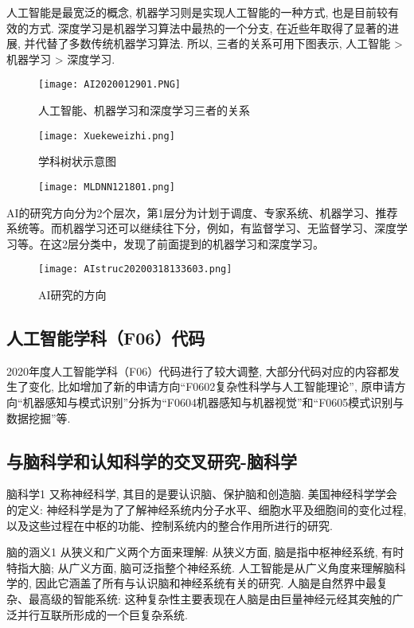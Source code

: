 人工智能是最宽泛的概念, 机器学习则是实现人工智能的一种方式, 也是目前较有效的方式. 深度学习是机器学习算法中最热的一个分支, 在近些年取得了显著的进展, 并代替了多数传统机器学习算法. 所以, 三者的关系可用下图表示, 人工智能 > 机器学习 > 深度学习.
\begin{figure}[htbp]
	\centering
	\texttt{[image: AI2020012901.PNG]}
	\caption{人工智能、机器学习和深度学习三者的关系}
   \label{AI2020012901}
\end{figure}
\begin{figure}[htbp]
	\centering
	\texttt{[image: Xuekeweizhi.png]}
	\caption{学科树状示意图}
   \label{AI:XuekeweizhiFig2}
\end{figure}
\begin{figure}[H]
\centering
\texttt{[image: MLDNN121801.png]}
\label{MLDNN12019121501}
\end{figure}
AI的研究方向分为2个层次，第1层分为计划于调度、专家系统、机器学习、推荐系统等。而机器学习还可以继续往下分，例如，有监督学习、无监督学习、深度学习等。在这2层分类中，发现了前面提到的机器学习和深度学习。
\begin{figure}[H]
\centering
\texttt{[image: AIstruc20200318133603.png]}
\caption{AI研究的方向}
\label{AIstruc20200318133603}
\end{figure}
\subsection{人工智能学科（F06）代码}
2020年度人工智能学科（F06）代码进行了较大调整, 大部分代码对应的内容都发生了变化, 比如增加了新的申请方向“F0602复杂性科学与人工智能理论”,
原申请方向“机器感知与模式识别”分拆为“F0604机器感知与机器视觉”和“F0605模式识别与数据挖掘”等.
\subsection{与脑科学和认知科学的交叉研究-脑科学}
\begin{mydef}{脑科学}{1}
又称神经科学, 其目的是要认识脑、保护脑和创造脑. 美国神经科学学会的定义: 神经科学是为了了解神经系统内分子水平、细胞水平及细胞间的变化过程, 以及这些过程在中枢的功能、控制系统内的整合作用所进行的研究.
\end{mydef}
\begin{mydef}{脑的涵义}{1}
从狭义和广义两个方面来理解: 从狭义方面, 脑是指中枢神经系统, 有时特指大脑; 从广义方面, 脑可泛指整个神经系统. 人工智能是从广义角度来理解脑科学的, 因此它涵盖了所有与认识脑和神经系统有关的研究.
    人脑是自然界中最复杂、最高级的智能系统: 这种复杂性主要表现在人脑是由巨量神经元经其突触的广泛并行互联所形成的一个巨复杂系统.
\end{mydef}

